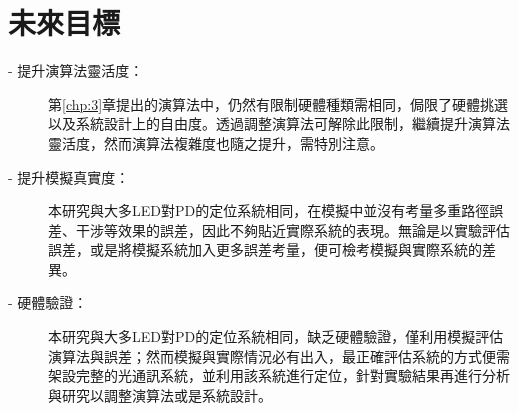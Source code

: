 

\section{未來目標}


\begin{description}

    \item[- 提升演算法靈活度：] 第\ref{chp:3}章提出的演算法中，仍然有限制硬體種類需相同，侷限了硬體挑選以及系統設計上的自由度。透過調整演算法可解除此限制，繼續提升演算法靈活度，然而演算法複雜度也隨之提升，需特別注意。
    
    \item[- 提升模擬真實度：] 本研究與大多LED對PD的定位系統相同，在模擬中並沒有考量多重路徑誤差、干涉等效果的誤差，因此不夠貼近實際系統的表現。無論是以實驗評估誤差，或是將模擬系統加入更多誤差考量，便可檢考模擬與實際系統的差異。
    
    \item[- 硬體驗證：]本研究與大多LED對PD的定位系統相同，缺乏硬體驗證，僅利用模擬評估演算法與誤差；然而模擬與實際情況必有出入，最正確評估系統的方式便需架設完整的光通訊系統，並利用該系統進行定位，針對實驗結果再進行分析與研究以調整演算法或是系統設計。
    
    

\end{description}
